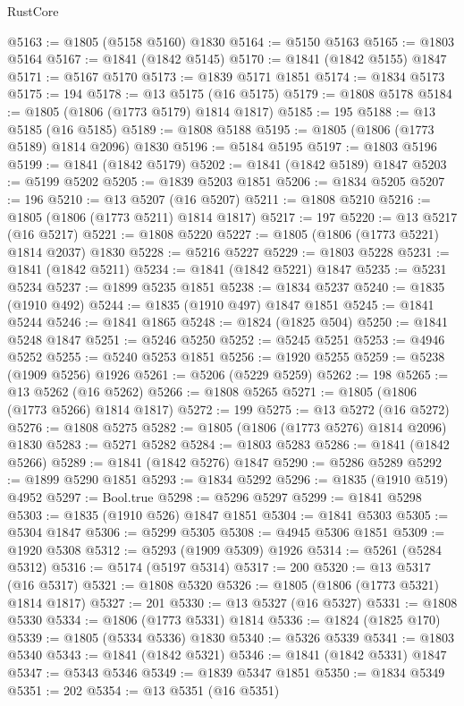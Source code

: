 \begin{lexlean}{RustCore}
\begin{coremodule}
@5163 := @1805 (@5158 @5160) @1830
@5164 := @5150 @5163
@5165 := @1803 @5164
@5167 := @1841 (@1842 @5145)
@5170 := @1841 (@1842 @5155) @1847
@5171 := @5167 @5170
@5173 := @1839 @5171 @1851
@5174 := @1834 @5173
@5175 := 194
@5178 := @13 @5175 (@16 @5175)
@5179 := @1808 @5178
@5184 := @1805 (@1806 (@1773 @5179) @1814 @1817)
@5185 := 195
@5188 := @13 @5185 (@16 @5185)
@5189 := @1808 @5188
@5195 := @1805 (@1806 (@1773 @5189) @1814 @2096) @1830
@5196 := @5184 @5195
@5197 := @1803 @5196
@5199 := @1841 (@1842 @5179)
@5202 := @1841 (@1842 @5189) @1847
@5203 := @5199 @5202
@5205 := @1839 @5203 @1851
@5206 := @1834 @5205
@5207 := 196
@5210 := @13 @5207 (@16 @5207)
@5211 := @1808 @5210
@5216 := @1805 (@1806 (@1773 @5211) @1814 @1817)
@5217 := 197
@5220 := @13 @5217 (@16 @5217)
@5221 := @1808 @5220
@5227 := @1805 (@1806 (@1773 @5221) @1814 @2037) @1830
@5228 := @5216 @5227
@5229 := @1803 @5228
@5231 := @1841 (@1842 @5211)
@5234 := @1841 (@1842 @5221) @1847
@5235 := @5231 @5234
@5237 := @1899 @5235 @1851
@5238 := @1834 @5237
@5240 := @1835 (@1910 @492)
@5244 := @1835 (@1910 @497) @1847 @1851
@5245 := @1841 @5244
@5246 := @1841 @1865
@5248 := @1824 (@1825 @504)
@5250 := @1841 @5248 @1847
@5251 := @5246 @5250
@5252 := @5245 @5251
@5253 := @4946 @5252
@5255 := @5240 @5253 @1851
@5256 := @1920 @5255
@5259 := @5238 (@1909 @5256) @1926
@5261 := @5206 (@5229 @5259)
@5262 := 198
@5265 := @13 @5262 (@16 @5262)
@5266 := @1808 @5265
@5271 := @1805 (@1806 (@1773 @5266) @1814 @1817)
@5272 := 199
@5275 := @13 @5272 (@16 @5272)
@5276 := @1808 @5275
@5282 := @1805 (@1806 (@1773 @5276) @1814 @2096) @1830
@5283 := @5271 @5282
@5284 := @1803 @5283
@5286 := @1841 (@1842 @5266)
@5289 := @1841 (@1842 @5276) @1847
@5290 := @5286 @5289
@5292 := @1899 @5290 @1851
@5293 := @1834 @5292
@5296 := @1835 (@1910 @519) @4952
@5297 := Bool.true
@5298 := @5296 @5297
@5299 := @1841 @5298
@5303 := @1835 (@1910 @526) @1847 @1851
@5304 := @1841 @5303
@5305 := @5304 @1847
@5306 := @5299 @5305
@5308 := @4945 @5306 @1851
@5309 := @1920 @5308
@5312 := @5293 (@1909 @5309) @1926
@5314 := @5261 (@5284 @5312)
@5316 := @5174 (@5197 @5314)
@5317 := 200
@5320 := @13 @5317 (@16 @5317)
@5321 := @1808 @5320
@5326 := @1805 (@1806 (@1773 @5321) @1814 @1817)
@5327 := 201
@5330 := @13 @5327 (@16 @5327)
@5331 := @1808 @5330
@5334 := @1806 (@1773 @5331) @1814
@5336 := @1824 (@1825 @170)
@5339 := @1805 (@5334 @5336) @1830
@5340 := @5326 @5339
@5341 := @1803 @5340
@5343 := @1841 (@1842 @5321)
@5346 := @1841 (@1842 @5331) @1847
@5347 := @5343 @5346
@5349 := @1839 @5347 @1851
@5350 := @1834 @5349
@5351 := 202
@5354 := @13 @5351 (@16 @5351)

\end{coremodule}
\end{lexlean}
